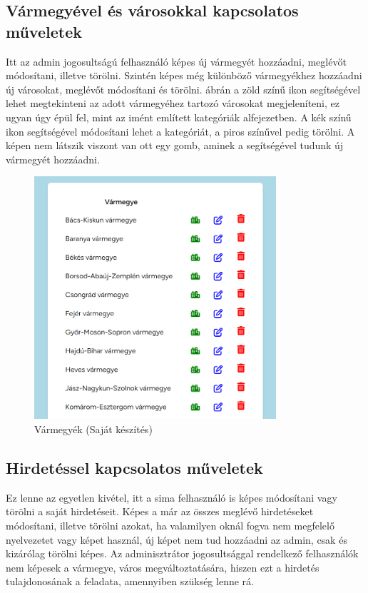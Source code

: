 \documentclass[]{thesis-ekf}
\theoremstyle{definition}
\theoremstyle{remark}
\begin{document}
	\subsection{Vármegyével és városokkal kapcsolatos műveletek}
		Itt az admin jogosultságú felhasználó képes új vármegyét hozzáadni, meglévőt módosítani, illetve törölni. Szintén képes még különböző vármegyékhez hozzáadni új városokat, meglévőt módosítani és törölni.  ábrán a zöld színű ikon segítségével lehet megtekinteni az adott vármegyéhez tartozó városokat megjeleníteni, ez ugyan úgy épül fel, mint az imént említett kategóriák  alfejezetben. A kék színű ikon segítségével módosítani lehet a kategóriát, a piros színűvel pedig törölni. A képen nem látszik viszont van ott egy gomb, aminek a segítségével tudunk új vármegyét hozzáadni.
		\begin{figure}[ht!]
			\centering
			\includegraphics[height=9cm]{./felhasznaloi/varmegye}
			\caption{Vármegyék (Saját készítés)} 
			\label{varmegye-varos-muvelet}
		\end{figure}
	\subsection{Hirdetéssel kapcsolatos műveletek}
		Ez lenne az egyetlen kivétel, itt a sima felhasználó is képes módosítani vagy törölni a saját hirdetéseit. Képes a már az összes meglévő hirdetéseket módosítani, illetve törölni azokat, ha valamilyen oknál fogva nem megfelelő nyelvezetet vagy képet használ, új képet nem tud hozzáadni az admin, csak és kizárólag törölni képes. Az adminisztrátor jogosultsággal rendelkező felhasználók nem képesek a vármegye, város megváltoztatására, hiszen ezt a hirdetés tulajdonosának a feladata, amennyiben szükség lenne rá.
\end{document}

